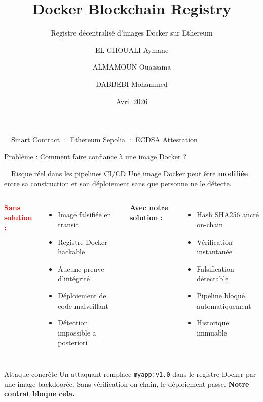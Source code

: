 \documentclass[aspectratio=169]{beamer}
\title{\textbf{Docker Blockchain Registry}}
\subtitle{Registre décentralisé d'images Docker sur Ethereum}
\author{
  EL-GHOUALI Aymane \and
  ALMAMOUN Ouassama \and
  DABBEBI Mohammed
}
\institute{Encadrant : \textbf{BOITIER William}}
\date{Avril 2026}
\begin{document}

\begin{frame}
  \titlepage
  \vspace{-0.5cm}
  \begin{center}
    \small\textcolor{dockerblue}{\faDocker\ \ Smart Contract · Ethereum Sepolia · ECDSA Attestation}
  \end{center}
\end{frame}

\begin{frame}{Problème : Comment faire confiance à une image Docker ?}

  \begin{alertblock}{\faExclamationTriangle\ \ Risque réel dans les pipelines CI/CD}
    Une image Docker peut être \textbf{modifiée} entre sa construction et son déploiement
    sans que personne ne le détecte.
  \end{alertblock}

  \vspace{0.4cm}

  \begin{columns}[T]
      \textbf{\textcolor{red}{Sans solution :}}
      \begin{itemize}
        \item[\faTimesCircle] Image falsifiée en transit
        \item[\faTimesCircle] Registre Docker hackable
        \item[\faTimesCircle] Aucune preuve d'intégrité
        \item[\faTimesCircle] Déploiement de code malveillant
        \item[\faTimesCircle] Détection impossible a posteriori
      \end{itemize}

      \textbf{\textcolor{emerald}{Avec notre solution :}}
      \begin{itemize}
        \item[\faCheckCircle] Hash SHA256 ancré on-chain
        \item[\faCheckCircle] Vérification instantanée
        \item[\faCheckCircle] Falsification détectable
        \item[\faCheckCircle] Pipeline bloqué automatiquement
        \item[\faCheckCircle] Historique immuable
      \end{itemize}
  \end{columns}

  \vspace{0.4cm}
  \begin{block}{Attaque concrète}
    \small
    Un attaquant remplace \texttt{myapp:v1.0} dans le registre Docker par une image backdoorée.
    Sans vérification on-chain, le déploiement passe. \textbf{Notre contrat bloque cela.}
  \end{block}

\end{frame}
\end{document}

